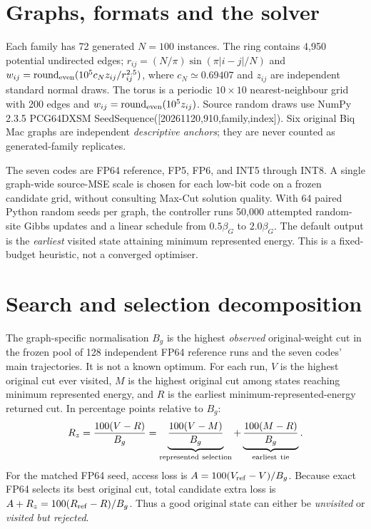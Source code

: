 \documentclass[11pt,a4paper,oneside]{report}
\begin{document}
\section{Graphs, formats and the solver}
Each family has 72 generated $N=100$ instances.
The ring contains 4,950 potential undirected edges;
$r_{ij}=(N/\pi)\sin(\pi|i-j|/N)$ and
$w_{ij}=\operatorname{round}_{\rm even}
(10^5c_N z_{ij}/r_{ij}^{2.5})$, where
$c_N\simeq0.69407$ and $z_{ij}$ are independent
standard normal draws. The torus is a periodic
$10\times10$ nearest-neighbour grid with 200 edges
and $w_{ij}=\operatorname{round}_{\rm even}(10^5z_{ij})$.
Source random draws use NumPy 2.3.5 PCG64DXSM
SeedSequence([20261120,910,family,index]).
Six original Biq Mac graphs are independent
\emph{descriptive anchors}; they are never counted
as generated-family replicates.

The seven codes are FP64 reference, FP5, FP6,
and INT5 through INT8. A single graph-wide source-MSE
scale is chosen for each low-bit code on a frozen candidate
grid, without consulting Max-Cut solution quality.
With 64 paired Python random seeds per graph, the
controller runs 50,000 attempted random-site Gibbs
updates and a linear schedule from $0.5\beta_G$
to $2.0\beta_G$. The default output is the
\emph{earliest} visited state attaining minimum
represented energy. This is a fixed-budget
heuristic, not a converged optimiser.

\section{Search and selection decomposition}
The graph-specific normalisation $B_g$ is the highest
\emph{observed} original-weight cut in the frozen pool
of 128 independent FP64 reference runs and the seven
codes' main trajectories. It is not a known optimum.
For each run, $V$ is the highest original cut ever visited,
$M$ is the highest original cut among states reaching
minimum represented energy, and $R$ is the earliest
minimum-represented-energy returned cut. In percentage
points relative to $B_g$:
\begin{equation}
R_z=\frac{100(V-R)}{B_g}
=\underbrace{\frac{100(V-M)}{B_g}}_{\rm represented\ selection}
+\underbrace{\frac{100(M-R)}{B_g}}_{\rm earliest\ tie}.
\end{equation}
For the matched FP64 seed, access loss is
$A=100(V_{\rm ref}-V)/B_g$.
Because exact FP64 selects its best original cut,
total candidate extra loss is $A+R_z
=100(R_{\rm ref}-R)/B_g$.
Thus a good original state can either be
\emph{unvisited} or \emph{visited but rejected}.
\end{document}
